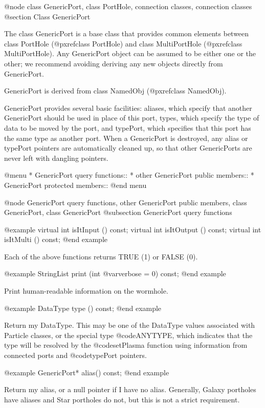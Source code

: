 @node class GenericPort, class PortHole, connection classes, connection classes
@section Class GenericPort

The class GenericPort is a base class that provides common elements
between class PortHole (@pxref{class PortHole})
and class MultiPortHole (@pxref{class MultiPortHole}).
Any GenericPort object
can be assumed to be either one or the other; we recommend avoiding
deriving any new objects directly from GenericPort.

GenericPort is derived from class NamedObj (@pxref{class NamedObj}).

GenericPort provides several basic facilities: aliases, which specify
that another GenericPort should be used in place of this port, types,
which specify the type of data to be moved by the port, and typePort,
which specifies that this port has the same type as another port.
When a GenericPort is destroyed, any alias or typePort pointers are
automatically cleaned up, so that other GenericPorts are never left
with dangling pointers.

@menu
* GenericPort query functions::
* other GenericPort public members::
* GenericPort protected members::
@end menu

@node GenericPort query functions, other GenericPort public members, class GenericPort, class GenericPort
@subsection GenericPort query functions

@example
virtual int isItInput () const;
virtual int isItOutput () const;
virtual int isItMulti () const;
@end example

Each of the above functions returns TRUE (1) or FALSE (0).

@example
StringList print (int @var{verbose} = 0) const;
@end example

Print human-readable information on the wormhole.

@example
DataType type () const;
@end example

Return my DataType.  This may be one of the DataType values associated
with Particle classes, or the special type @code{ANYTYPE}, which
indicates that the type will be resolved by the @code{setPlasma}
function using information from connected ports and @code{typePort} pointers.

@example
GenericPort* alias() const;
@end example

Return my alias, or a null pointer if I have no alias.  Generally,
Galaxy portholes have aliases and Star portholes do not, but this
is not a strict requirement.

